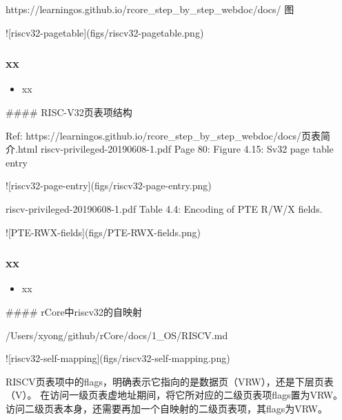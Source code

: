 https://learningos.github.io/rcore_step_by_step_webdoc/docs/%
图

![riscv32-pagetable](figs/riscv32-pagetable.png)

\begin{frame}
    \frametitle{xx}
    \begin{itemize}
        \item xx
    \end{itemize}
\end{frame}
#### RISC-V32页表项结构

Ref: https://learningos.github.io/rcore_step_by_step_webdoc/docs/页表简介.html
riscv-privileged-20190608-1.pdf
Page 80:
Figure 4.15: Sv32 page table entry

![riscv32-page-entry](figs/riscv32-page-entry.png)

riscv-privileged-20190608-1.pdf
Table 4.4: Encoding of PTE R/W/X fields.

![PTE-RWX-fields](figs/PTE-RWX-fields.png)



\begin{frame}
    \frametitle{xx}
    \begin{itemize}
        \item xx
    \end{itemize}
\end{frame}
#### rCore中riscv32的自映射

/Users/xyong/github/rCore/docs/1_OS/RISCV.md

![riscv32-self-mapping](figs/riscv32-self-mapping.png)

RISCV页表项中的flags，明确表示它指向的是数据页（VRW），还是下层页表（V）。
在访问一级页表虚地址期间，将它所对应的二级页表项flags置为VRW。
访问二级页表本身，还需要再加一个自映射的二级页表项，其flags为VRW。

